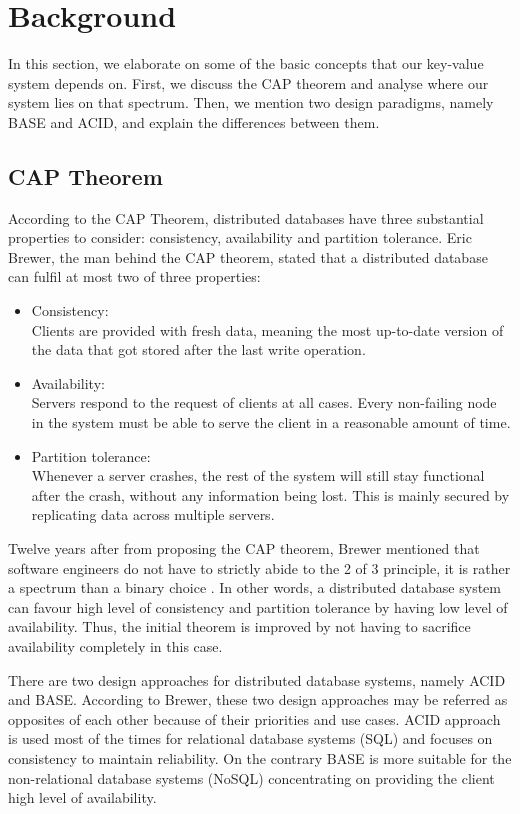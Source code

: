 \section{Background}
\label{sec:background}
In this section, we elaborate on some of the basic concepts that our key-value system depends on. First, we discuss the CAP theorem and analyse where our system lies on that spectrum. Then, we mention two design paradigms, namely BASE and ACID, and explain the differences between them.

\subsection{CAP Theorem}
\label{sec:background_cap} 
According to the CAP Theorem, distributed databases have three substantial properties to consider: consistency, availability and partition tolerance\cite{brewer2012cap}. Eric Brewer, the man behind the CAP theorem, stated that a distributed database can fulfil at most two of three properties\cite{brewer2000cap}:

\begin{itemize}
  \item Consistency: \\
  Clients are provided with fresh data, meaning the most up-to-date version of the data that got stored after the last write operation.
  \item Availability: \\
  Servers respond to the request of clients at all cases. Every non-failing node in the system must be able to serve the client in a reasonable amount of time\cite{gilbert2002brewer}.
  \item Partition tolerance: \\
  Whenever a server crashes, the rest of the system will still stay functional after the crash, without any information being lost. This is mainly secured by replicating data across multiple servers.
\end{itemize}

Twelve years after from proposing the CAP theorem, Brewer mentioned that software engineers do not have to strictly abide to the 2 of 3 principle, it is rather a spectrum than a binary choice \cite{brewer2012cap}. In other words, a distributed database system can favour high level of consistency and partition tolerance by having low level of availability. Thus, the initial theorem is improved by not having to sacrifice availability completely in this case.

There are two design approaches for distributed database systems, namely ACID and BASE. According to Brewer, these two design approaches may be referred as opposites of each other\cite{brewer2012cap} because of their priorities and use cases. ACID approach is used most of the times for relational database systems (SQL) and focuses on consistency to maintain reliability. On the contrary BASE is more suitable for the non-relational database systems (NoSQL) concentrating on providing the client high level of availability\cite{brewer2000cap}.


